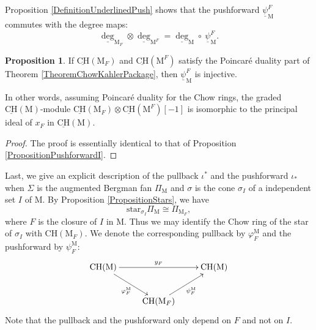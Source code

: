 \documentclass[11pt,reqno]{amsart}
\theoremstyle{definition}
\newtheorem{proposition}[theorem]{Proposition}
\theoremstyle{remark}
\renewcommand{\(}{\left(}
\renewcommand{\)}{\right)}
\newcommand{\<}{\left<}
\renewcommand{\>}{\right>}
\begin{document}
Proposition \ref{DefinitionUnderlinedPush} shows that
the pushforward $\underline{\psi}^F_\mathrm{M}$ commutes with the degree maps: %
\[
\underline{\deg}_{\mathrm{M}_F} \otimes \underline{\deg}_{\mathrm{M}^F} = \underline{\deg}_\mathrm{M} \circ\ \underline{\psi}_\mathrm{M}^F.
\]



\begin{proposition}\label{upsi injective}
If   $\underline{\mathrm{CH}}(\mathrm{M}_F)$ and $\underline{\mathrm{CH}}(\mathrm{M}^F)$ satisfy the Poincar\'e duality part of Theorem \ref{TheoremChowKahlerPackage},
then %
$\underline{\psi}^F_\mathrm{M}$ is injective.
\end{proposition}

In other words, assuming Poincar\'e duality for the Chow rings,
 the graded $\underline{\mathrm{CH}}(\mathrm{M})$-module $ \underline{\mathrm{CH}}(\mathrm{M}_F) \otimes \underline{\mathrm{CH}}(\mathrm{M}^F)[-1]$ 
is isomorphic to  the principal ideal of $x_F$ in $\underline{\mathrm{CH}}(\mathrm{M})$.


\begin{proof}
The proof is essentially identical to that of Proposition \ref{PropositionPushforwardI}.
\end{proof}


Last, we give an explicit description of the pullback $\iota^*$ and the pushforward $\iota_*$ when $\Sigma$ is the  augmented Bergman fan $\Pi_\mathrm{M}$ and $\sigma$ is the cone $\sigma_I$ of  a  independent set  $I$ of $\mathrm{M}$.
By Proposition \ref{PropositionStars}, we have
\[
 \text{star}_{\sigma_I} \Pi_\mathrm{M} \cong \Pi_{\mathrm{M}_F},
\]
where $F$ is the closure of $I$ in $\mathrm{M}$.
Thus we may identify the Chow ring of the star  of $\sigma_I$ with  $\mathrm{CH}(\mathrm{M}_F)$.
We denote the corresponding pullback  by $\varphi^\mathrm{M}_F$ and the pushforward  by $\psi^\mathrm{M}_F$:
\[
\xymatrix{
\mathrm{CH}(\mathrm{M})  \ar[rr]^{y_F} \ar[dr]_{\varphi_F^\mathrm{M}}&&\mathrm{CH}(\mathrm{M}) 
\\
& \mathrm{CH}(\mathrm{M}_F)  \ar[ur]_{\psi_F^\mathrm{M}}&
}
\]
Note that the pullback  and the pushforward only depend on $F$ and not on $I$.
\end{document}
